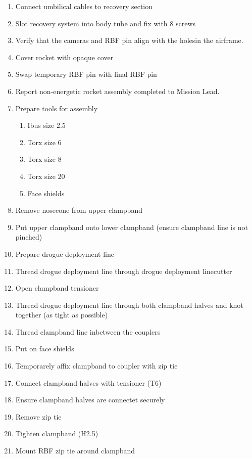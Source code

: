\begin{enumerate}[label=R\arabic*.]
    \item Connect umbilical cables to recovery section \checkbox
    \item Slot recovery system into body tube and fix with 8 screws\checkbox
    \item Verify that the cameras and RBF pin align with the holes\newline in the airframe.\checkbox
    \item Cover rocket with opaque cover\checkbox
    \item Swap temporary RBF pin with final RBF pin\checkbox
    \item \label{rocket_non_energetic_end} Report non-energetic rocket assembly completed to Mission Lead.\checkbox
    
    \item \label{rocket_energetic_start} Prepare tools for assembly \checkbox
    \begin{enumerate}
        \item Ibus size 2.5 \checkbox
        \item Torx size 6 \checkbox
        \item Torx size 8 \checkbox
        \item Torx size 20 \checkbox
        \item Face shields \checkbox
    \end{enumerate}
    \item Remove nosecone from upper clampband\checkbox
    \item Put upper clampband onto lower clampband (ensure clampband line is not pinched) \checkbox
    \item Prepare drogue deployment line \checkbox  
    \item Thread drogue deployment line through drogue deployment linecutter \checkbox
    \item Open clampband tensioner \checkbox
    \item Thread drogue deployment line through both clampband halves and knot together (as tight as possible)\checkbox
    \item Thread clampband line inbetween the couplers \checkbox
    \item Put on face shields \checkbox
    \item Temporarely affix clampband to coupler with zip tie \checkbox
    \item Connect clampband halves with tensioner (T6) \checkbox
    \item Ensure clampband halves are connectet securely \checkbox
    \item Remove zip tie \checkbox
    \item Tighten clampband (H2.5) \checkbox
    \item \label{rocket_energetic_end} Mount RBF zip tie around clampband \checkbox
    

\end{enumerate}

